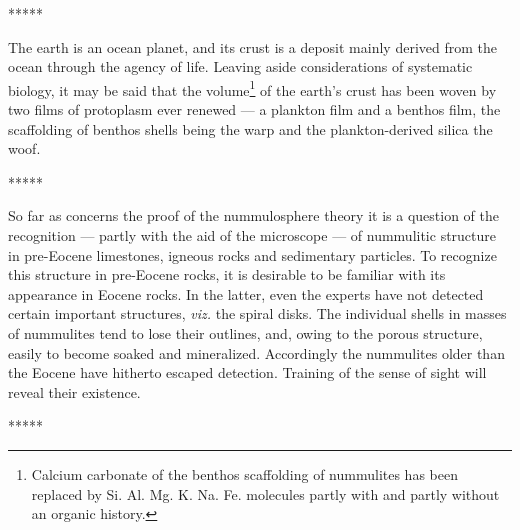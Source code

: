 \documentclass[a4paper, 12pt, oneside]{article}
\begin{document}
\centerline{*\hspace{15mm}*\hspace{15mm}*\hspace{15mm}*\hspace{15mm}*}
\bigskip

The earth is an ocean planet, and its crust is a deposit mainly derived from the ocean through the agency of life. Leaving aside considerations of systematic biology, it may be said that the volume\footnote{Calcium carbonate of the benthos scaffolding of nummulites has been replaced by Si. Al. Mg. K. Na. Fe. molecules partly with and partly without an organic history.} of the earth's crust has been woven by two films of protoplasm ever renewed --- a plankton film and a benthos film, the scaffolding of benthos shells being the warp and the plankton-derived silica the woof.

\centerline{*\hspace{15mm}*\hspace{15mm}*\hspace{15mm}*\hspace{15mm}*}
\bigskip

So far as concerns the proof of the nummulosphere theory it is a question of the recognition --- partly with the aid of the microscope --- of nummulitic structure in pre-Eocene limestones, igneous rocks and sedimentary particles. To recognize this structure in pre-Eocene rocks, it is desirable to be familiar with its appearance in Eocene rocks. In the latter, even the experts have not detected certain important structures, \emph{viz.} the spiral disks. The individual shells in masses of nummulites tend to lose their outlines, and, owing to the porous structure, easily to become soaked and mineralized. Accordingly the nummulites older than the Eocene have hitherto escaped detection. Training of the sense of sight will reveal their existence.

\centerline{*\hspace{15mm}*\hspace{15mm}*\hspace{15mm}*\hspace{15mm}*}
\bigskip
\end{document}
